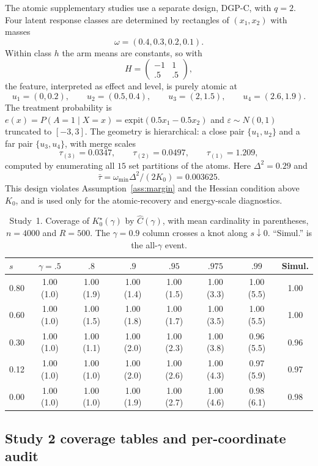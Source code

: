 \documentclass[11pt]{article}
\newcommand{\eps}{\varepsilon}
\begin{document}
The atomic supplementary studies use a separate design, DGP-C, with $q=2$.  Four latent response classes are determined by rectangles of $(x_1,x_2)$ with masses
\[
\omega=(0.4,0.3,0.2,0.1).
\]
Within class $h$ the arm means are constants, so with
\[
H=
\begin{pmatrix}
-1 & 1\\
.5 & .5
\end{pmatrix},
\]
the feature, interpreted as effect and level, is purely atomic at
\[
u_1=(0,0.2),\qquad
u_2=(0.5,0.4),\qquad
u_3=(2,1.5),\qquad
u_4=(2.6,1.9).
\]
The treatment probability is $e(x)=P(A=1\mid X=x)=\mathrm{expit}(0.5x_1-0.5x_2)$ and $\eps\sim N(0,1)$ truncated to $[-3,3]$.  The geometry is hierarchical: a close pair $\{u_1,u_2\}$ and a far pair $\{u_3,u_4\}$, with merge scales
\[
\tau_{(3)}=0.0347,\qquad
\tau_{(2)}=0.0497,\qquad
\tau_{(1)}=1.209,
\]
computed by enumerating all $15$ set partitions of the atoms.  Here $\Delta^2=0.29$ and
\[
\bar\tau=\omega_{\min}\Delta^2/(2K_0)=0.003625.
\]
This design violates Assumption~\ref{ass:margin} and the Hessian condition above $K_0$, and is used only for the atomic-recovery and energy-scale diagnostics.

\begin{table}[t]
\centering
\caption{Study~1. Coverage of $K^\star_0(\gamma)$ by $\widehat C(\gamma)$, with mean cardinality in parentheses, $n=4000$ and $R=500$.  The $\gamma=0.9$ column crosses a knot along $s\downarrow0$.  ``Simul.'' is the all-$\gamma$ event.}
\label{tab:sims:coverage_K_C}
\begin{tabular}{l cccccc c}
\toprule
$s$ & $\gamma=.5$ & $.8$ & $.9$ & $.95$ & $.975$ & $.99$ & Simul.\\
\midrule
0.80 & 1.00 (1.0) & 1.00 (1.9) & 1.00 (1.4) & 1.00 (1.5) & 1.00 (3.3) & 1.00 (5.5) & 1.00\\
0.60 & 1.00 (1.0) & 1.00 (1.5) & 1.00 (1.8) & 1.00 (1.7) & 1.00 (3.5) & 1.00 (5.5) & 1.00\\
0.30 & 1.00 (1.0) & 1.00 (1.1) & 1.00 (2.0) & 1.00 (2.3) & 1.00 (3.8) & 0.96 (5.5) & 0.96\\
0.12 & 1.00 (1.0) & 1.00 (1.0) & 1.00 (2.0) & 1.00 (2.6) & 1.00 (4.3) & 0.97 (5.9) & 0.97\\
0.00 & 1.00 (1.0) & 1.00 (1.0) & 1.00 (1.9) & 1.00 (2.7) & 1.00 (4.6) & 0.98 (6.1) & 0.98\\
\bottomrule
\end{tabular}
\end{table}

\subsection{Study 2 coverage tables and per-coordinate audit}\label{sec:sims:study2_supp}
\end{document}

